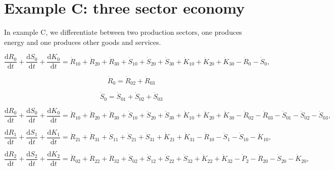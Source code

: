 \section{Example C: three sector economy}
\label{sec:C_materials}

In example C, we differentiate between two production sectors, one produces energy and one produces other goods and services.


\begin{equation} \label{eq:C-CV_R_dot_0a}
	\frac{\mathrm{d}R_{0}}{\mathrm{d}t} 
	+ \frac{\mathrm{d}S_{0}}{\mathrm{d}t}	
	+ \frac{\mathrm{d}K_0}{\mathrm{d}t}
	=  \dot{R}_{10} + \dot{R}_{20} + \dot{R}_{30}
	+ \dot{S}_{10} + \dot{S}_{20} + \dot{S}_{30}
	+ \dot{K}_{10} + \dot{K}_{20} + \dot{K}_{30}
	- \dot{R}_{0} 
	- \dot{S}_{0},
\end{equation}

\begin{equation}
	\dot{R}_{0} = \dot{R}_{02} + \dot{R}_{03}
\end{equation}

\begin{equation}
	\dot{S}_{0} = \dot{S}_{01} + \dot{S}_{02} + \dot{S}_{03}
\end{equation}

 \begin{equation} \label{eq:C-CV_R_dot_0b}
 	\frac{\mathrm{d}R_{0}}{\mathrm{d}t} 
 	+ \frac{\mathrm{d}S_{0}}{\mathrm{d}t}	
 	+ \frac{\mathrm{d}K_0}{\mathrm{d}t}
 	=  \dot{R}_{10} + \dot{R}_{20} + \dot{R}_{30}
 	+ \dot{S}_{10} + \dot{S}_{20} + \dot{S}_{30}
 	+ \dot{K}_{10} + \dot{K}_{20} + \dot{K}_{30}
 	- \dot{R}_{02} - \dot{R}_{03} 
 	- \dot{S}_{01} - \dot{S}_{02} - \dot{S}_{03},
 \end{equation}
 
 \begin{equation} \label{eq:C-CV_R_dot_1}
 	\frac{\mathrm{d}R_{1}}{\mathrm{d}t} 
	+ \frac{\mathrm{d}S_{1}}{\mathrm{d}t}
 	+ \frac{\mathrm{d}K_{1}}{\mathrm{d}t}
 	=  \dot{R}_{21} + \dot{R}_{31}
 	+ \dot{S}_{11} + \dot{S}_{21} + \dot{S}_{31}
 	+ \dot{K}_{21} + \dot{K}_{31}
 	- \dot{R}_{10} 
 	- \dot{S}_{1} - \dot{S}_{10} 
 	- \dot{K}_{10},
 \end{equation}
 
 \begin{equation} \label{eq:C-CV_R_dot_2}
 	\frac{\mathrm{d}R_{2}}{\mathrm{d}t} 
	+ \frac{\mathrm{d}S_{2}}{\mathrm{d}t}
 	+ \frac{\mathrm{d}K_{2}}{\mathrm{d}t}
 	=  \dot{R}_{02} + \dot{R}_{22} + \dot{R}_{32}
 	+ \dot{S}_{02} + \dot{S}_{12} + \dot{S}_{22} + \dot{S}_{32} 
 	+ \dot{K}_{22} + \dot{K}_{32}
 	- \dot{P}_{2}
 	- \dot{R}_{20} 
 	- \dot{S}_{20} 
 	- \dot{K}_{20},
 \end{equation}
 

